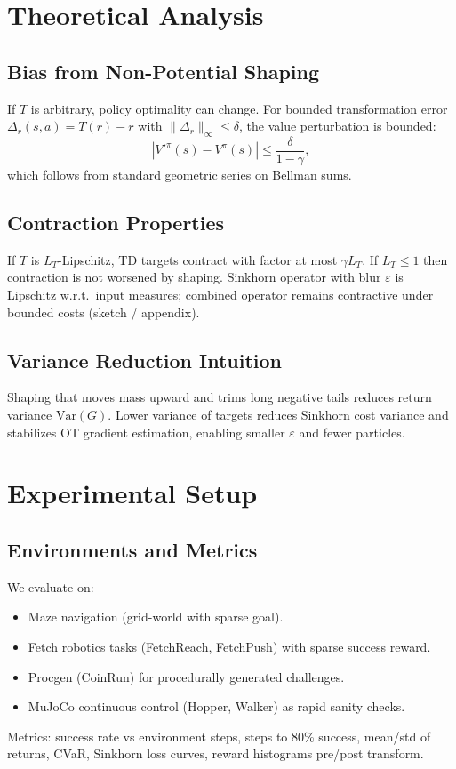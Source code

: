 \documentclass{article}
\begin{document}
\section{Theoretical Analysis}
\subsection{Bias from Non-Potential Shaping}
If $T$ is arbitrary, policy optimality can change. For bounded transformation error $\Delta_r(s,a)=T(r)-r$ with $\|\Delta_r\|_\infty \le \delta$, the value perturbation is bounded:
\begin{equation}
|V'^\pi(s)-V^\pi(s)| \le \frac{\delta}{1-\gamma},
\label{eq:bias_bound}
\end{equation}
which follows from standard geometric series on Bellman sums.

\subsection{Contraction Properties}
If $T$ is $L_T$-Lipschitz, TD targets contract with factor at most $\gamma L_T$. If $L_T\le1$ then contraction is not worsened by shaping. Sinkhorn operator with blur $\varepsilon$ is Lipschitz w.r.t.\ input measures; combined operator remains contractive under bounded costs (sketch / appendix).

\subsection{Variance Reduction Intuition}
Shaping that moves mass upward and trims long negative tails reduces return variance $\mathrm{Var}(G)$. Lower variance of targets reduces Sinkhorn cost variance and stabilizes OT gradient estimation, enabling smaller $\varepsilon$ and fewer particles.

\section{Experimental Setup}
\subsection{Environments and Metrics}
We evaluate on:
\begin{itemize}
  \item Maze navigation (grid-world with sparse goal).
  \item Fetch robotics tasks (FetchReach, FetchPush) with sparse success reward.
  \item Procgen (CoinRun) for procedurally generated challenges.
  \item MuJoCo continuous control (Hopper, Walker) as rapid sanity checks.
\end{itemize}
Metrics: success rate vs environment steps, steps to 80\% success, mean/std of returns, CVaR, Sinkhorn loss curves, reward histograms pre/post transform.
\end{document}
